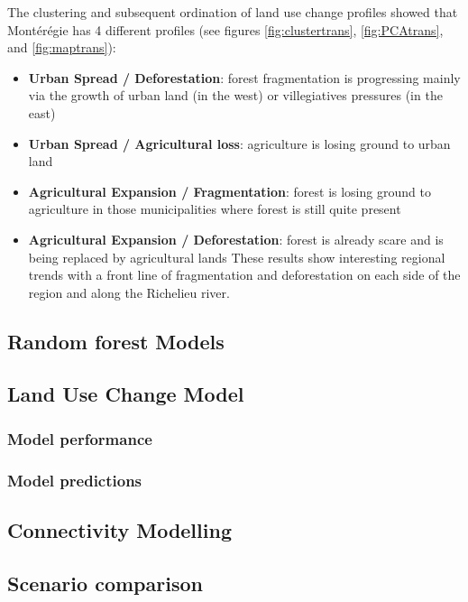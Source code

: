 The clustering and subsequent ordination of land use change profiles showed that Montérégie has 4 different profiles (see figures \ref{fig:clustertrans}, \ref{fig:PCAtrans}, and \ref{fig:maptrans}):
\begin{itemize}[leftmargin=0.5cm]
  \item \textbf{Urban Spread / Deforestation}: forest fragmentation is progressing mainly via the growth of urban land (in the west) or villegiatives pressures (in the east)
  \item \textbf{Urban Spread / Agricultural loss}: agriculture is losing ground to urban land
  \item \textbf{Agricultural Expansion / Fragmentation}: forest is losing ground to agriculture in those municipalities where forest is still quite present
  \item \textbf{Agricultural Expansion / Deforestation}: forest is already scare and is being replaced by agricultural lands
These results show interesting regional trends with a front line of fragmentation and deforestation on each side of the region and along the Richelieu river. \\ %
\end{itemize}

\subsection{Random forest Models}

\subsection{Land Use Change Model}

\subsubsection{Model performance}

\subsubsection{Model predictions}

\subsection{Connectivity Modelling}

\subsection{Scenario comparison}

